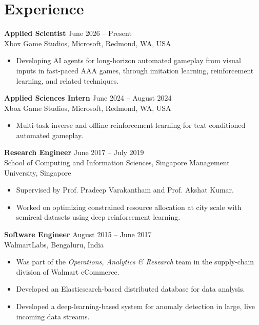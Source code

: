 \documentclass[letterpaper,11pt]{article}
\begin{document}
\section*{Experience}
\textbf{Applied Scientist} \hfill June 2026 -- Present\\
Xbox Game Studios, Microsoft, Redmond, WA, USA
\vspace{-1em}
\begin{itemize}
    \setlength\itemsep{0em}
  \item Developing AI agents for long-horizon automated gameplay from visual inputs in fast-paced AAA games, through imitation learning, reinforcement learning, and related techniques.
\end{itemize}
\vspace{-0.5em}
\textbf{Applied Sciences Intern} \hfill June 2024 -- August 2024\\
Xbox Game Studios, Microsoft, Redmond, WA, USA
\vspace{-1em}
\begin{itemize}
    \setlength\itemsep{0em}
  \item Multi-task inverse and offline reinforcement learning for text conditioned automated gameplay.
\end{itemize}
\vspace{-0.5em}
\textbf{Research Engineer} \hfill June 2017 -- July 2019\\
School of Computing and Information Sciences, Singapore Management University, Singapore
\vspace{-1em}
\begin{itemize}
    \setlength\itemsep{0em}
  \item Supervised by Prof. Pradeep Varakantham and Prof. Akshat Kumar.
  \item Worked on optimizing constrained resource allocation at city scale with semireal datasets using deep reinforcement learning.
\end{itemize}
\vspace{-0.5em}
\textbf{Software Engineer} \hfill August 2015 -- June 2017\\
WalmartLabs, Bengaluru, India
\vspace{-1em}
\begin{itemize}
    \setlength\itemsep{0em}
  \item Was part of the \emph{Operations, Analytics \& Research} team in the supply-chain division of Walmart eCommerce.
  \item Developed an Elasticsearch-based distributed database for data analysis.
  \item Developed a deep-learning-based system for anomaly detection in large, live incoming data streams.
\end{itemize}
\end{document}
